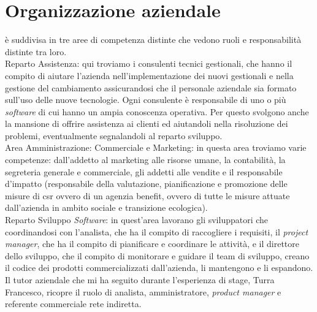 \section{Organizzazione aziendale}
{\company} è suddivisa in tre aree di competenza distinte che vedono ruoli e responsabilità distinte tra loro.\\
Reparto Assistenza: qui troviamo i consulenti tecnici gestionali, che hanno il compito di aiutare l'azienda nell'implementazione dei nuovi gestionali 
e nella gestione del cambiamento assicurandosi che il personale aziendale sia formato sull'uso delle nuove tecnologie. Ogni consulente è responsabile di uno 
o più \textit{software} di cui hanno un ampia conoscenza operativa. Per questo svolgono anche la mansione di offrire assistenza ai clienti ed aiutandoli 
nella risoluzione dei problemi, eventualmente segnalandoli al reparto sviluppo.\\
Area Amministrazione: Commerciale e Marketing: in questa area troviamo varie competenze: dall'addetto al marketing alle risorse umane, 
la contabilità, la segreteria generale e commerciale, gli addetti alle vendite e il responsabile d'impatto (responsabile della valutazione, 
pianificazione e promozione delle misure di \gls{csr} ovvero di un agenzia benefit, ovvero di tutte le misure attuate dall'azienda in ambito sociale 
e transizione ecologica).\\
Reparto Sviluppo \textit{Software}: in quest'area lavorano gli sviluppatori che coordinandosi con l'analista, che ha il compito di raccogliere 
i requisiti, il \textit{project manager}, che ha il compito di pianificare e coordinare le attività, e il direttore dello sviluppo, che il compito di 
monitorare e guidare il team di sviluppo, creano il codice dei prodotti commercializzati dall'azienda, li mantengono e li espandono.\\
Il tutor aziendale che mi ha seguito durante l'esperienza di stage, Turra Francesco, ricopre il ruolo di analista, amministratore, \textit{product manager}
 e referente commerciale rete indiretta.
